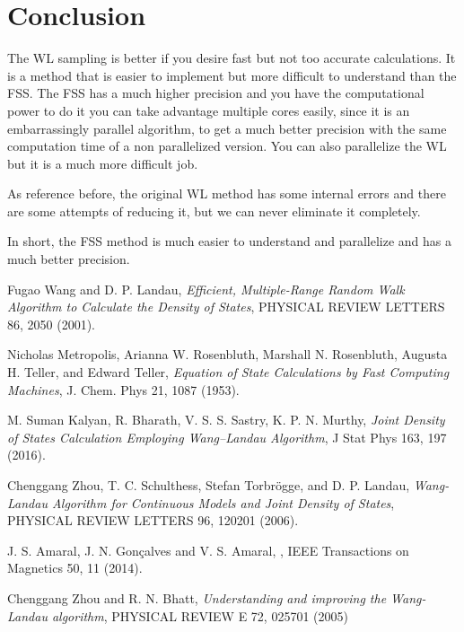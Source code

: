 \documentclass[a4paper, 11pt]{article}
\begin{document}
	 \newpage 
	 
	 
	 
	
	
	
	\section{Conclusion}
	
	The WL sampling is better if you desire fast but not too accurate calculations. It is a method that is easier to implement but more difficult to understand than the FSS. The FSS has a much higher precision and you have the computational power to do it you can take advantage multiple cores easily, since it is an embarrassingly parallel algorithm, to get a much better precision with the same computation time of a non parallelized version. You can also parallelize the WL but it is a much more difficult job\cite{JDOS_diff}.
	
	As reference before, the original WL method has some internal errors and there are some attempts \cite{WL_error1} of reducing it, but we can never eliminate it completely.
	
	In short, the FSS method is much easier to understand and parallelize and has a much better precision.
	
	\newpage
	
	\begin{thebibliography}{9}
		Fugao Wang and D. P. Landau,
		\textit{Efficient, Multiple-Range Random Walk Algorithm to Calculate the Density of States},
		PHYSICAL REVIEW LETTERS 86, 2050 (2001).
		
		Nicholas Metropolis, Arianna W. Rosenbluth, Marshall N. Rosenbluth, Augusta H. Teller, and Edward Teller,
		\textit{Equation of State Calculations by Fast Computing Machines},
		J. Chem. Phys 21, 1087 (1953). 
		
		M. Suman Kalyan, R. Bharath, V. S. S. Sastry, K. P. N. Murthy,
		\textit{Joint Density of States Calculation Employing Wang–Landau Algorithm},
		J Stat Phys 163, 197 (2016).
		
		Chenggang Zhou, T. C. Schulthess, Stefan Torbr\"{o}gge, and D. P. Landau,
		\textit{Wang-Landau Algorithm for Continuous Models and Joint Density of States},
		PHYSICAL REVIEW LETTERS 96, 120201 (2006).
		
		J. S. Amaral, J. N. Gonçalves and V. S. Amaral,
		,
		IEEE Transactions on Magnetics 50, 11 (2014).
		
		Chenggang Zhou and R. N. Bhatt,
		\textit{Understanding and improving the Wang-Landau algorithm},
		PHYSICAL REVIEW E 72, 025701 (2005)
		
	\end{thebibliography}
	
\end{document}
